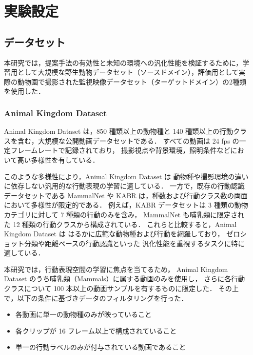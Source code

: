 \chapter{実験設定}
\label{chap:experiment_settings}

\section{データセット}
本研究では，提案手法の有効性と未知の環境への汎化性能を検証するために，学習用として大規模な野生動物データセット（ソースドメイン），評価用として実際の動物園で撮影された監視映像データセット（ターゲットドメイン）の2種類を使用した．

\subsection{Animal Kingdom Dataset}
Animal Kingdom Dataset \cite{ng2022animal} は，850 種類以上の動物種と
140 種類以上の行動クラスを含む，大規模な公開動画データセットである．
すべての動画は 24 fps の一定フレームレートで記録されており，
撮影視点や背景環境，照明条件などにおいて高い多様性を有している．

このような多様性により，Animal Kingdom Dataset は
動物種や撮影環境の違いに依存しない汎用的な行動表現の学習に適している．
一方で，既存の行動認識データセットである MammalNet \cite{mammalnet}
や KABR \cite{kabr} は，種数および行動クラス数の両面において多様性が限定的である．
例えば，KABR データセットは 3 種類の動物カテゴリに対して
7 種類の行動のみを含み，
MammalNet も哺乳類に限定された 12 種類の行動クラスから構成されている．
これらと比較すると，Animal Kingdom Dataset は
はるかに広範な動物種および行動を網羅しており，
ゼロショット分類や距離ベースの行動認識といった
汎化性能を重視するタスクに特に適している．

本研究では，行動表現空間の学習に焦点を当てるため，
Animal Kingdom Dataset のうち哺乳類（Mammals）に属する動画のみを使用し，
さらに各行動クラスについて 100 本以上の動画サンプルを有するものに限定した．
その上で，以下の条件に基づきデータのフィルタリングを行った．

\begin{itemize}
  \item 各動画に単一の動物種のみが映っていること
  \item 各クリップが 16 フレーム以上で構成されていること
  \item 単一の行動ラベルのみが付与されている動画であること
\end{itemize}

